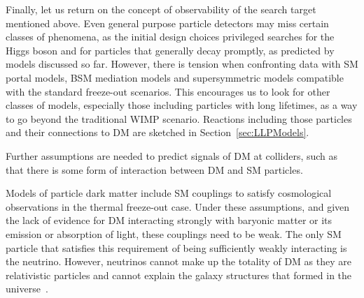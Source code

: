
Finally, let us return on the concept of observability of the search target mentioned above. Even general purpose particle detectors may miss certain classes of phenomena, as the initial design choices privileged searches for the Higgs boson and for particles that generally decay promptly, as predicted by models discussed so far. However, there is tension when confronting data with SM portal models, BSM mediation models and supersymmetric models compatible with the standard freeze-out scenarios. This encourages us to look for other classes of models, especially those including particles with long lifetimes, as a way to go beyond the traditional WIMP scenario. Reactions including those particles and their connections to DM are sketched in Section~\ref{sec:LLPModels}.




Further assumptions are needed to predict signals of DM at colliders, such as that there is some form of interaction between DM and SM particles. 

Models of particle dark matter include SM couplings to satisfy cosmological observations in the thermal freeze-out case. 
Under these assumptions, and given the lack of evidence for DM interacting strongly with baryonic matter or its emission or absorption of light, these couplings need to be weak. 
The only SM particle that satisfies this requirement of being sufficiently weakly interacting is the neutrino.
However, neutrinos cannot make up the totality of DM as they are relativistic particles and cannot explain the galaxy structures that formed in the  universe~\cite{PlehnLecturesDM}. 



